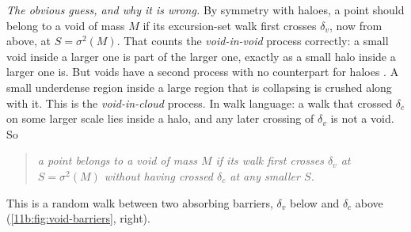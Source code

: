 \emph{The obvious guess, and why it is wrong.} By symmetry with haloes, a point
should belong to a void of mass $M$ if its excursion-set walk first crosses
$\delta_v$, now from above, at $S=\sigma^2(M)$. That counts the
\emph{void-in-void} process correctly: a small void inside a larger one is part of
the larger one, exactly as a small halo inside a larger one is. But voids have a
second process with no counterpart for haloes .
A small underdense region inside a large region that is collapsing is crushed
along with it. This is the \emph{void-in-cloud} process. In walk language: a walk
that crossed $\delta_c$ on some larger scale lies inside a halo, and any later
crossing of $\delta_v$ is not a void. So
\begin{quote}
\emph{a point belongs to a void of mass $M$ if its walk first crosses $\delta_v$
at $S=\sigma^2(M)$ without having crossed $\delta_c$ at any smaller $S$.}
\end{quote}
This is a random walk between two absorbing barriers, $\delta_v$ below and
$\delta_c$ above (\cref{11b:fig:void-barriers}, right).

